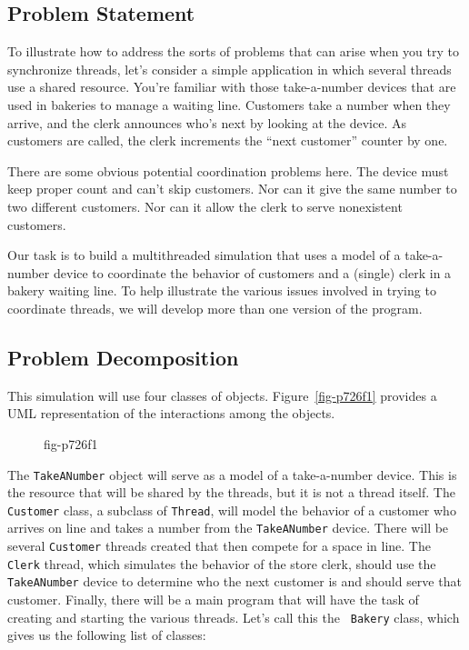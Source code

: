 \subsection{Problem Statement}
\noindent To illustrate how to address the sorts of problems that can arise when
you try to synchronize threads, let's consider a simple application in
which several threads use a shared resource.   You're familiar with
those take-a-number devices that are used in bakeries to manage a
waiting line.  Customers take a number when they arrive, and the clerk
announces who's next by looking at the device.  As customers are
called, the clerk increments the ``next customer'' counter by one.

There are some obvious potential coordination problems here.   The device
must keep proper count and can't skip customers.  Nor can it give the
same number to two different customers.  Nor can it allow the clerk to
serve nonexistent customers.

Our task is to build a multithreaded simulation that uses a
model of a take-a-number device to coordinate the behavior of
customers and a (single) clerk in a bakery waiting line.  To help
illustrate the various issues involved in trying to coordinate
threads, we will develop more than one version of the program.

\subsection*{Problem Decomposition}
\noindent This simulation will use four classes of objects.
  Figure~\ref{fig-p726f1}
provides a UML representation of the interactions among the
objects. 
\begin{figure}[h!]
{fig-p726f1}
\end{figure}
The {\tt TakeANumber} object will serve as a model of a
take-a-number device.  This is the resource that will be shared by the
threads, but it is not a thread itself.  The {\tt Customer} class, a
subclass of {\tt Thread}, will model the behavior of a customer who
arrives on line and takes a number from the {\tt TakeANumber} device.
There will be several {\tt Customer} threads created that then compete
for a space in line.  The {\tt Clerk} thread, which simulates the
behavior of the store clerk, should use the {\tt TakeANumber} device
to determine who the next customer is and should serve that customer.
Finally, there will be a main program that will have the task of
creating and starting the various threads.  Let's call this the {\tt
Bakery} class, which gives us the following list of classes:

